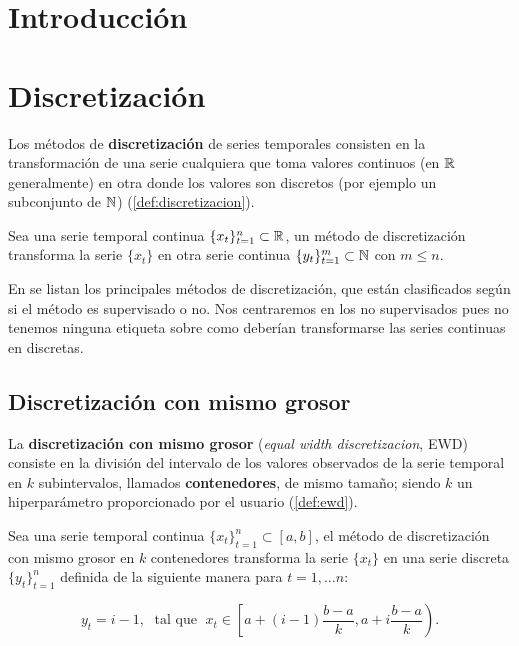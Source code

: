 
\chapter{Introducción}\label{ch:sd-introduccion}


\chapter{Discretización}

Los métodos de \textbf{discretización} de series temporales consisten en la transformación de una serie cualquiera que toma valores continuos (en $\mathbb{R}$ generalmente) en otra donde los valores son discretos (por ejemplo un subconjunto de $\mathbb{N}$) (\autoref{def:discretizacion}).

\begin{definicion}[Discretización]
  Sea una serie temporal continua $\{x_t\}_{t = 1}^n \subset \mathbb{R}$, un método de discretización transforma la serie $\{x_t\}$ en otra serie continua $\{y_t\}_{t = 1}^m \subset \mathbb{N}$ con $m \leq n$.
  \label{def:discretizacion}
\end{definicion}

En \cite{chaudhari2014discretization} se listan los principales métodos de discretización, que están clasificados según si el método es supervisado o no. Nos centraremos en los no supervisados pues no tenemos ninguna etiqueta sobre como deberían transformarse las series continuas en discretas.

\section{Discretización con mismo grosor}

La \textbf{discretización con mismo grosor} (\emph{equal width discretizacion}, EWD) consiste en la división del intervalo de los valores observados de la serie temporal en $k$ subintervalos, llamados \textbf{contenedores}, de mismo tamaño; siendo $k$ un hiperparámetro proporcionado por el usuario (\autoref{def:ewd}).

\begin{definicion}
  Sea una serie temporal continua $\{x_t\}_{t = 1}^n \subset [a, b]$, el método de discretización con mismo grosor en $k$ contenedores transforma la serie $\{x_t\}$ en una serie discreta $\{y_t\}_{t = 1}^n$ definida de la siguiente manera para $t = 1, \ldots n$:

  $$y_t = i-1, \; \text{ tal que } \; x_t \in \left[a + (i-1) \dfrac{b - a}{k}, a + i \dfrac{b-a}{k}\right).$$
  \label{def:ewd}
\end{definicion}

